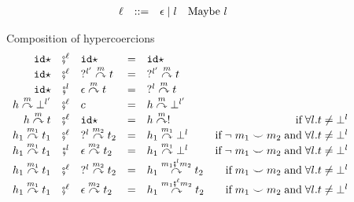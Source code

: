 \documentclass[acmsmall,review,anonymous]{acmart}\settopmatter{printfolios=true,printccs=false,printacmref=false}
\newcommand{\stxrule}[3]{#1 & ::= & #3 & \text{#2}\\}
\newcommand{\comprule}[4]{#1 & \fatsemi^\ell & #2 & = & #3 & #4 \\}
\newcommand{\comprulel}[4]{#1 & \fatsemi^l & #2 & = & #3 & #4 \\}
\newcommand{\sidecond}[1]{\text{if}\;#1}
\newcommand{\hyperCoercionI}[0]{\mathtt{id\star}}
\newcommand{\hyperCoercionC}[3]{#1 \overset{#2}{\curvearrowright} #3}
\begin{document}
\begin{figure}
	\[
	\begin{array}{rclr}
	\stxrule{\ell}{Maybe $ l $}{\epsilon \mid l}
	\end{array}
	\]
	
	Composition of hypercoercions 
	\[ 
	\begin{array}{rclclr}
	
	\comprule{
		\hyperCoercionI
	}{
		\hyperCoercionI
	}{
		\hyperCoercionI
	}{}
	
	\comprule{
		\hyperCoercionI
	}{
		\hyperCoercionC{?^{l'}}{m}{t}
	}{
		\hyperCoercionC{?^{l'}}{m}{t}
	}{}
	
	\comprulel{
		\hyperCoercionI
	}{
		\hyperCoercionC{\epsilon}{m}{t}
	}{
		\hyperCoercionC{?^{l}}{m}{t}
	}{}
	
	\comprule{
		\hyperCoercionC{h}{m}{\bot^{l'}}
	}{
		c
	}{
		\hyperCoercionC{h}{m}{\bot^{l'}}
	}{}
	
	\comprule{
		\hyperCoercionC{h}{m}{t}
	}{
		\hyperCoercionI
	}{
		\hyperCoercionC{h}{m}{!}
	}{
		\sidecond{\forall l. t \neq \bot^{l}}
	}
	
	\comprule{
		\hyperCoercionC{h_1}{m_1}{t_1}
	}{
		\hyperCoercionC{?^l}{m_2}{t_2}
	}{
		\hyperCoercionC{h_1}{m_1}{\bot^l}
	}{
		\sidecond{
			\neg \; m_1 \smile m_2
			\; \text{and} \;
			\forall l. t \neq \bot^{l}
		}
	}

\comprulel{
\hyperCoercionC{h_1}{m_1}{t_1}
}{
\hyperCoercionC{\epsilon}{m_2}{t_2}
}{
\hyperCoercionC{h_1}{m_1}{\bot^l}
}{
\sidecond{
	\neg \; m_1 \smile m_2
	\; \text{and} \;
	\forall l. t \neq \bot^{l}
}
}
\comprule{
\hyperCoercionC{h_1}{m_1}{t_1}
}{
\hyperCoercionC{?^l}{m_2}{t_2}
}{
\hyperCoercionC{h_1}{m_1 \fatsemi^{l} m_2}{t_2}
}{
\sidecond{
	m_1 \smile m_2
	\; \text{and} \;
	\forall l. t \neq \bot^{l}
}
}
	\comprule{
		\hyperCoercionC{h_1}{m_1}{t_1}
	}{
		\hyperCoercionC{\epsilon}{m_2}{t_2}
	}{
		\hyperCoercionC{h_1}{m_1 \fatsemi^{\ell} m_2}{t_2}
	}{
		\sidecond{
			m_1 \smile m_2
			\; \text{and} \;
			\forall l. t \neq \bot^{l}
		}
	}
%
%	
	\end{array}
	\]
	

\end{figure}
\end{document}
